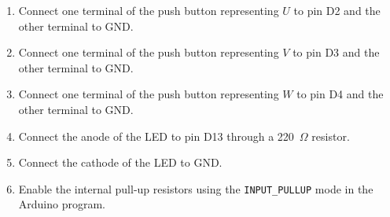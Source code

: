\documentclass[12pt,a4paper]{article}
\begin{document}
\begin{enumerate}
    \item Connect one terminal of the push button representing $U$ to pin D2 and the other terminal to GND.
    
    \item Connect one terminal of the push button representing $V$ to pin D3 and the other terminal to GND.
    
    \item Connect one terminal of the push button representing $W$ to pin D4 and the other terminal to GND.
    
    \item Connect the anode of the LED to pin D13 through a 220~$\Omega$ resistor.
    
    \item Connect the cathode of the LED to GND.
    
    \item Enable the internal pull-up resistors using the \texttt{INPUT\_PULLUP} mode in the Arduino program.
\end{enumerate}
\end{document}

